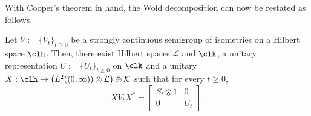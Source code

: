  With Cooper's theorem in hand, the Wold decomposition can now be restated as follows. 
 
 \begin{thm}
 Let $V:=\{V_{t}\}_{t \geq 0}$ be a strongly continuous semigroup of isometries on a Hilbert space $\clh$. Then, there exist Hilbert spaces $\mathcal{L}$ and $\clk$, a  unitary representation $U:=\{U_t\}_{t \geq 0}$ on $\clk$ and a unitary $X:\clh \to \big(L^{2}((0,\infty))\otimes \mathcal{L} \big)\oplus \mathcal{K}$ such that for every $t \geq 0$,
 \[XV_tX^{*}=\begin{bmatrix}
 S_t \otimes 1 & 0 \\
 0 & U_t
 \end{bmatrix}.\] 
 
 
 
 \end{thm}
 
 
 
  